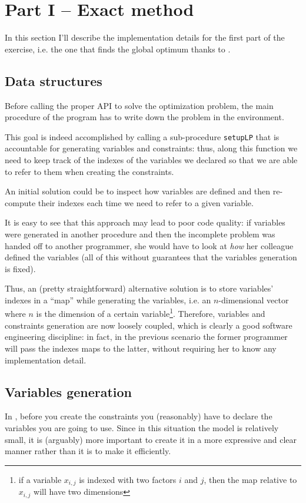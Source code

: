 \section{Part I -- Exact method}

In this section I'll describe the implementation details for the first part of
the exercise, i.e. the one that finds the global optimum thanks to \cplex.

\subsection{Data structures}
Before calling the proper API to solve the optimization problem, the main
procedure of the program has to write down the problem in the \cplex{}
environment.

This goal is indeed accomplished by calling a sub-procedure \texttt{setupLP}
that is accountable for generating variables and constraints: thus, along this
function we need to keep track of the indexes of the variables we declared so
that we are able to refer to them when creating the constraints.

An initial solution could be to inspect how variables are defined and then
re-compute their indexes each time we need to refer to a given variable.

It is easy to see that this approach may lead to poor code quality: if variables
were generated in another procedure and then the incomplete problem was handed
off to another programmer, she would have to look at \textit{how} her colleague
defined the variables (all of this without guarantees that the variables
generation is fixed).

Thus, an (pretty straightforward) alternative solution is to store variables'
indexes in a ``map'' while generating the variables, i.e. an $n$-dimensional
vector where $n$ is the dimension of a certain variable\footnote{if a variable
$x_{i,j}$ is indexed with two factors $i$ and $j$, then the map relative to
$x_{i,j}$ will have two dimensions}.
Therefore, variables and constraints generation are now loosely coupled, which
is clearly a good software engineering discipline: in fact, in the previous
scenario the former programmer will pass the indexes maps to the latter, without
requiring her to know any implementation detail.

\subsection{Variables generation}
In \cplex, before you create the constraints you (reasonably) have to declare
the variables you are going to use. Since in this situation the model is
relatively small, it is (arguably) more important to create it in a more
expressive and clear manner rather than it is to make it efficiently.

